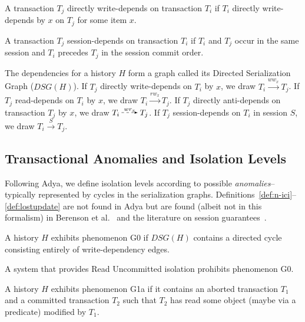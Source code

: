 \begin{definition}
A transaction $T_j$ directly write-depends on transaction $T_i$ if
$T_i$ directly write-depends by $x$ on $T_j$ for some item $x$.
\end{definition}

\begin{definition}
\label{def:sd1}
A transaction $T_j$ session-depends on transaction $T_i$ if $T_i$ and
$T_j$ occur in the same session and $T_i$ precedes $T_j$ in the
session commit order.
\end{definition}

The dependencies for a history $H$ form a graph called its Directed
Serialization Graph ($DSG(H)$). If $T_j$ directly write-depends on
$T_i$ by $x$, we draw $T_i\overset{ww_x}\longrightarrow T_j$. If $T_j$
read-depends on $T_i$ by $x$, we draw
$T_i \overset{rw_x}\longrightarrow T_j$. If $T_j$ directly
anti-depends on transaction $T_j$ by $x$, we draw
$T_i \overset{wr_x}\DashedArrow T_j$. If $T_j$ session-depends on
$T_i$ in session $S$, we draw $T_i \overset{S}\longrightarrow T_j$.

\subsection{Transactional Anomalies and Isolation Levels}

Following Adya, we define isolation levels according to
possible \textit{anomalies}--typically represented by cycles in the
serialization graphs. Definitions~\ref{def:n-ici}--\ref{def:lostupdate}
are not found in Adya but are found (albeit not in this formalism) in
Berenson et al.~\cite{ansicritique} and the literature on session
guarantees~\cite{sessionguarantees, vogels-defs}.

\begin{definition}
A history $H$ exhibits phenomenon G0 if $DSG(H)$ contains a directed
cycle consisting entirely of write-dependency edges.
\end{definition}

\begin{definition}
A system that provides Read Uncommitted isolation prohibits phenomenon G0.
\end{definition}

\begin{definition}
A history $H$ exhibits phenomenon G1a if it contains an aborted
transaction $T_1$ and a committed transaction $T_2$ such that $T_2$ has read
some object (maybe via a predicate) modiﬁed by $T_1$.
\end{definition}

